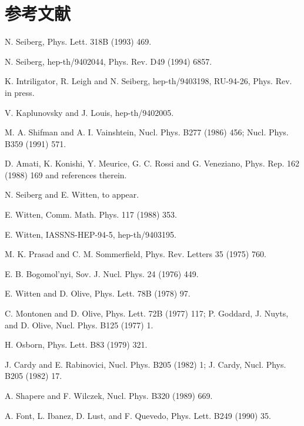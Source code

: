 \documentclass[11pt,a4paper,UTF8,fontset=fandol]{ctexart}
\theoremstyle{plain}
\theoremstyle{definition}
\begin{document}

\section*{参考文献}

\begin{enumerate}[label={[\arabic*]}, leftmargin=2.4em, itemsep=1pt, topsep=4pt]
  \item N. Seiberg, Phys. Lett. 318B (1993) 469.
  \item N. Seiberg, hep-th/9402044, Phys. Rev. D49 (1994) 6857.
  \item K. Intriligator, R. Leigh and N. Seiberg, hep-th/9403198, RU-94-26,
        Phys. Rev. in press.
  \item V. Kaplunovsky and J. Louis, hep-th/9402005.
  \item M. A. Shifman and A. I. Vainshtein, Nucl. Phys. B277 (1986) 456;
        Nucl. Phys. B359 (1991) 571.
  \item D. Amati, K. Konishi, Y. Meurice, G. C. Rossi and G. Veneziano,
        Phys. Rep. 162 (1988) 169 and references therein.
  \item N. Seiberg and E. Witten, to appear.
  \item E. Witten, Comm. Math. Phys. 117 (1988) 353.
  \item E. Witten, IASSNS-HEP-94-5, hep-th/9403195.
  \item M. K. Prasad and C. M. Sommerfield, Phys. Rev. Letters 35 (1975) 760.
  \item E. B. Bogomol'nyi, Sov. J. Nucl. Phys. 24 (1976) 449.
  \item E. Witten and D. Olive, Phys. Lett. 78B (1978) 97.
  \item C. Montonen and D. Olive, Phys. Lett. 72B (1977) 117; P. Goddard,
        J. Nuyts, and D. Olive, Nucl. Phys. B125 (1977) 1.
  \item H. Osborn, Phys. Lett. B83 (1979) 321.
  \item J. Cardy and E. Rabinovici, Nucl. Phys. B205 (1982) 1; J. Cardy,
        Nucl. Phys. B205 (1982) 17.
  \item A. Shapere and F. Wilczek, Nucl. Phys. B320 (1989) 669.
  \item A. Font, L. Ibanez, D. Lust, and F. Quevedo, Phys. Lett. B249 (1990) 35.

\end{enumerate}
\end{document}
